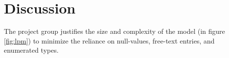 \documentclass[a4paper]{scrartcl}
\begin{document}









\clearpage
\section{Discussion}
  \label{sec:discussion}
The project group justifies the size and complexity of the model (in figure \ref{fig:lpm})
to minimize the reliance on null-values, free-text entries, and enumerated types.
\end{document}

